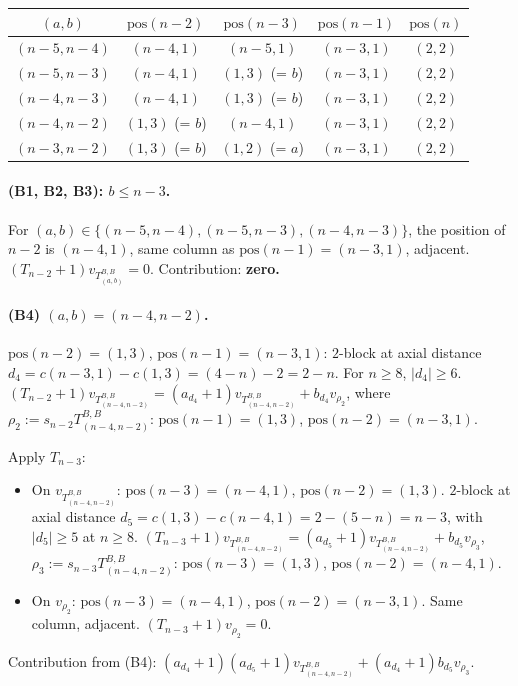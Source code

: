 \documentclass[11pt]{article}
\theoremstyle{definition}
\begin{document}
\begin{center}
\begin{tabular}{ccccc}
\toprule
$(a, b)$ & $\mathrm{pos}(n-2)$ & $\mathrm{pos}(n-3)$ & $\mathrm{pos}(n-1)$ & $\mathrm{pos}(n)$ \\
\midrule
$(n{-}5, n{-}4)$ & $(n{-}4, 1)$ & $(n{-}5, 1)$ & $(n{-}3, 1)$ & $(2, 2)$ \\
$(n{-}5, n{-}3)$ & $(n{-}4, 1)$ & $(1, 3)$ (= $b$) & $(n{-}3, 1)$ & $(2, 2)$ \\
$(n{-}4, n{-}3)$ & $(n{-}4, 1)$ & $(1, 3)$ (= $b$) & $(n{-}3, 1)$ & $(2, 2)$ \\
$(n{-}4, n{-}2)$ & $(1, 3)$ (= $b$) & $(n{-}4, 1)$ & $(n{-}3, 1)$ & $(2, 2)$ \\
$(n{-}3, n{-}2)$ & $(1, 3)$ (= $b$) & $(1, 2)$ (= $a$) & $(n{-}3, 1)$ & $(2, 2)$ \\
\bottomrule
\end{tabular}
\end{center}

\paragraph{(B1, B2, B3): $b \le n-3$.}
For $(a, b) \in \{(n{-}5, n{-}4), (n{-}5, n{-}3), (n{-}4, n{-}3)\}$,
the position of $n-2$ is $(n-4, 1)$, same column as
$\mathrm{pos}(n-1) = (n-3, 1)$, adjacent.
$(T_{n-2}{+}1) v_{T^{B,B}_{(a, b)}} = 0$. Contribution: \textbf{zero.}

\paragraph{(B4) $(a, b) = (n{-}4, n{-}2)$.}
$\mathrm{pos}(n-2) = (1, 3)$, $\mathrm{pos}(n-1) = (n-3, 1)$:
$2$-block at axial distance
$d_4 = c(n-3, 1) - c(1, 3) = (4-n) - 2 = 2-n$.
For $n \ge 8$, $|d_4| \ge 6$.
$(T_{n-2}{+}1) v_{T^{B,B}_{(n-4,n-2)}} = (a_{d_4}{+}1) v_{T^{B,B}_{(n-4,n-2)}}
+ b_{d_4} v_{\rho_2}$, where
$\rho_2 := s_{n-2} T^{B,B}_{(n-4, n-2)}$: $\mathrm{pos}(n-1) = (1, 3)$,
$\mathrm{pos}(n-2) = (n-3, 1)$.

Apply $T_{n-3}$:
\begin{itemize}[leftmargin=2em,topsep=0.3em,itemsep=0.2em]
\item On $v_{T^{B,B}_{(n-4,n-2)}}$: $\mathrm{pos}(n-3) = (n-4, 1)$,
$\mathrm{pos}(n-2) = (1, 3)$. $2$-block at axial distance
$d_5 = c(1, 3) - c(n-4, 1) = 2 - (5-n) = n-3$, with $|d_5| \ge 5$
at $n \ge 8$.
$(T_{n-3}{+}1) v_{T^{B,B}_{(n-4,n-2)}} = (a_{d_5}{+}1) v_{T^{B,B}_{(n-4,n-2)}}
+ b_{d_5} v_{\rho_3}$,
$\rho_3 := s_{n-3} T^{B,B}_{(n-4, n-2)}$: $\mathrm{pos}(n-3) = (1, 3)$,
$\mathrm{pos}(n-2) = (n-4, 1)$.
\item On $v_{\rho_2}$: $\mathrm{pos}(n-3) = (n-4, 1)$,
$\mathrm{pos}(n-2) = (n-3, 1)$. Same column, adjacent.
$(T_{n-3}{+}1) v_{\rho_2} = 0$.
\end{itemize}
Contribution from (B4): $(a_{d_4}{+}1)(a_{d_5}{+}1) v_{T^{B,B}_{(n-4,n-2)}}
+ (a_{d_4}{+}1) b_{d_5} v_{\rho_3}$.
\end{document}
